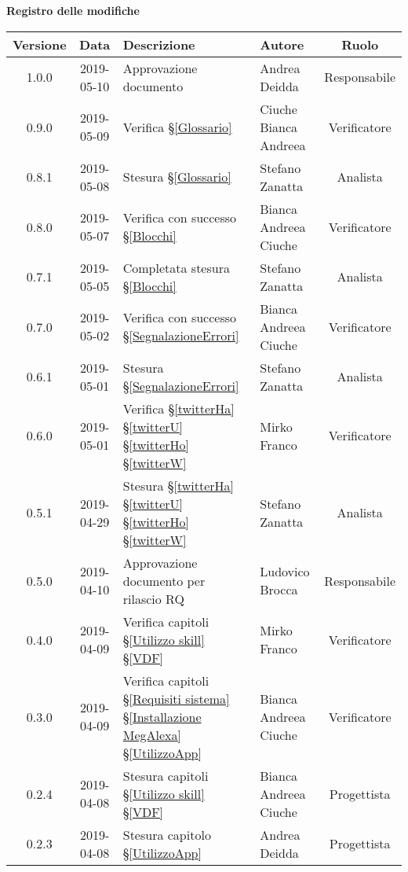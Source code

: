 	\begin{center}
		\textbf{Registro delle modifiche}
	\end{center}
	\begin{center}
		\begin{tabularx}{\textwidth}{|c|c|X|X|c|}
			\hline
			\textbf{Versione} & \textbf{Data} & \textbf{Descrizione} & \textbf{Autore} & \textbf{Ruolo} \\
			\hline
			1.0.0 & 2019-05-10& Approvazione documento & Andrea Deidda & Responsabile \\
			\hline
			0.9.0 & 2019-05-09& Verifica \S\ref{Glossario}& Ciuche Bianca Andreea & Verificatore \\
			\hline
			0.8.1 & 2019-05-08&Stesura \S\ref{Glossario}& Stefano Zanatta & Analista \\
			\hline
		    0.8.0 & 2019-05-07& Verifica con successo \S\ref{Blocchi} &Bianca Andreea Ciuche &Verificatore\\
			\hline
			0.7.1 & 2019-05-05& Completata stesura \S\ref{Blocchi} & Stefano Zanatta & Analista \\
			\hline
			0.7.0 & 2019-05-02& Verifica con successo \S\ref{SegnalazioneErrori} & Bianca Andreea Ciuche & Verificatore \\
			\hline
			0.6.1 & 2019-05-01& Stesura \S\ref{SegnalazioneErrori}& Stefano Zanatta & Analista \\
			\hline
		    0.6.0 & 2019-05-01& Verifica  \S\ref{twitterHa} \S\ref{twitterU} \S\ref{twitterHo} \S\ref{twitterW}& Mirko Franco  & Verificatore \\
			\hline
			0.5.1 & 2019-04-29& Stesura \S\ref{twitterHa} \S\ref{twitterU} \S\ref{twitterHo} \S\ref{twitterW} & Stefano Zanatta & Analista \\
			\hline
			0.5.0 & 2019-04-10 & Approvazione documento per rilascio RQ & Ludovico Brocca & Responsabile \\
			\hline
			0.4.0 & 2019-04-09 & Verifica capitoli \S\ref{Utilizzo skill}  \S\ref{VDF}  & Mirko Franco & Verificatore \\
			\hline
			0.3.0 & 2019-04-09 & Verifica capitoli \S\ref{Requisiti sistema}  \S\ref{Installazione MegAlexa}  \S\ref{UtilizzoApp}  & Bianca Andreea Ciuche & Verificatore \\
			\hline
			0.2.4 & 2019-04-08 & Stesura capitoli \S\ref{Utilizzo skill}  \S\ref{VDF}  & Bianca Andreea Ciuche & Progettista \\
			\hline
			0.2.3 & 2019-04-08 & Stesura capitolo \S\ref{UtilizzoApp} & Andrea Deidda & Progettista \\

\end{tabularx}
\end{center}
